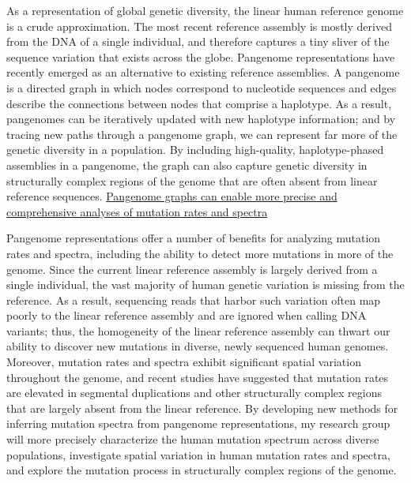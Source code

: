 \documentclass[11pt,a4paper,sans]{moderncv}
\begin{document}
As a representation of global genetic diversity, the linear human reference genome 
is a crude approximation. The most recent reference assembly is mostly derived from
the DNA of a single individual, and therefore captures a tiny sliver of the 
sequence variation that exists across the globe. Pangenome representations have 
recently emerged as an alternative to existing reference assemblies. A pangenome 
is a directed graph in which nodes correspond to nucleotide sequences and edges 
describe the connections between nodes that comprise a haplotype. As a result, 
pangenomes can be iteratively updated with new haplotype information; and by 
tracing new paths through a pangenome graph, we can represent far more of the 
genetic diversity in a population. By including high-quality, haplotype-phased 
assemblies in a pangenome, the graph can also capture genetic diversity in 
structurally complex regions of the genome that are often absent from linear 
reference sequences. 
\break \break
\underline{Pangenome graphs can enable more precise and comprehensive analyses of mutation rates and spectra}


Pangenome representations offer a number of benefits for analyzing mutation rates 
and spectra, including the ability to detect more mutations in more of the genome. 
Since the current linear reference assembly is largely derived from a single 
individual, the vast majority of human genetic variation is missing from the 
reference. As a result, sequencing reads that harbor such variation often map 
poorly to the linear reference assembly and are ignored when calling DNA variants;
thus, the homogeneity of the linear reference assembly can thwart our ability 
to discover new mutations in diverse, newly sequenced human genomes. Moreover, 
mutation rates and spectra exhibit significant spatial variation throughout the 
genome, and recent studies have suggested that mutation rates are elevated in 
segmental duplications and other structurally complex regions that are largely 
absent from the linear reference. By developing new methods for inferring mutation
spectra from pangenome representations, my research group will more precisely 
characterize the human mutation spectrum across diverse populations, investigate
spatial variation in human mutation rates and spectra, and explore the mutation
process in structurally complex regions of the genome.
\end{document}
